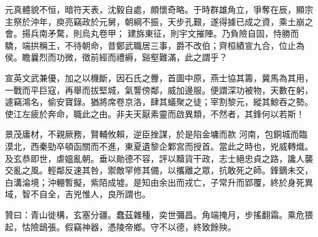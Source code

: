 \begin{pinyinscope}
 元真體貌不恒，暗符天表，沈毅自處，頗懷奇略。于時群雄角立，爭奪在辰，顯宗主祭於沖年，庾亮竊政於元舅，朝綱不振，天步孔艱，遂得據已成之資，乘土崩之會。揚兵南矛騖，則烏丸卷甲；
 建旆東征，則宇文摧陣。乃負險自固，恃勝而驕，端拱稱王，不待朝命，昔鄭武職居三事，爵不改伯；齊桓績宣九合，位止為侯。瞻曩烈而功微，徵前經而禮縟，谿壑難滿，此之謂乎？



 宣英文武兼優，加之以機斷，因石氏之釁，首圖中原，燕士協其籌，冀馬為其用，一戰而平巨寇，再舉而拔堅城，氣讋傍鄰，威加邊服。便謂深功被物，天數在躬，遽竊鴻名，偷安寶錄。猶將席卷京洛，肆其蟻聚之徒；宰割黎元，縱其鯨吞之勢。使江左疲於奔命，職此之由。非夫天厭素靈而啟異類，不然者，其鋒何以若斯！



 景茂庸材，不親厥務，賢輔攸賴，逆臣挫謀，於是陷金墉而款
 河南，包銅城而臨漠北，西秦勁卒頓函關而不進，東夏遺黎企鄴宮而授首。當此之時也，兇威轉熾。及玄恭即世，虐媼亂朝。垂以勛德不容，評以黷貨干政，志士絕忠貞之路，讒人襲交亂之風。輕鄰反速其咎，禦敵罕修其備，以攜離之眾，抗敢死之師。鋒鏑未交，白溝淪境；沖輣暫擬，紫陌成墟。是知由余出而戎亡，子常升而郢覆，終於身死異域，智不自全，吉兇惟人，良所謂也。



 贊曰：青山徙構，玄塞分疆。蠢茲雜種，奕世彌昌。角端掩月，步搖翻霜。乘危猥起，怙險鴟張。假竊神器，憑陵帝鄉。守不以德，終致餘殃。



\end{pinyinscope}